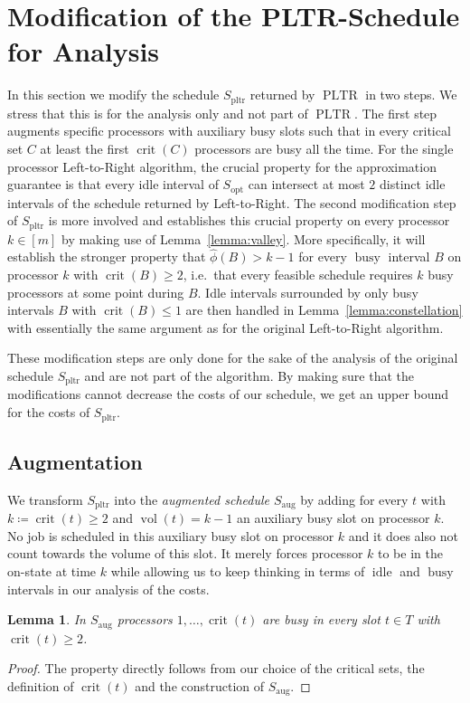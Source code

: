 \documentclass[a4paper]{article}
\DeclareMathOperator{\idle}{idle}
\DeclareMathOperator{\busy}{busy}
\DeclareMathOperator{\opt}{opt}
\DeclareMathOperator{\pltr}{pltr}
\DeclareMathOperator{\PLTR}{PLTR}
\DeclareMathOperator{\aug}{aug}
\DeclareMathOperator{\vol}{vol}
\DeclareMathOperator{\crit}{crit}
\newtheorem{lemma}[theorem]{Lemma}
\begin{document}
\section{Modification of the PLTR-Schedule for Analysis}\label{section:approximation}
In this section we modify the schedule $S_{\pltr}$ returned by $\PLTR$ in two steps.
We stress that this is for the analysis only and not part of $\PLTR$.
The first step augments specific processors with auxiliary busy slots such that in every critical set $C$ at least the first $\crit(C)$ processors are busy all the time.
For the single processor Left-to-Right algorithm, the crucial property for the approximation guarantee is that every idle interval of $S_{\opt}$ can intersect at most $2$ distinct idle intervals of the schedule returned by Left-to-Right.
The second modification step of $S_{\pltr}$ is more involved and establishes this crucial property on every processor $k \in [m]$ by making use of Lemma~\ref{lemma:valley}.
More specifically, it will establish the stronger property that $\hat \phi(B) > k - 1$ for every $\busy$ interval $B$ on processor $k$ with $\crit(B) \geq 2$, i.e.\ that every feasible schedule requires $k$ busy processors at some point during $B$.
Idle intervals surrounded by only busy intervals $B$ with $\crit(B) \leq 1$ are then handled in Lemma~\ref{lemma:constellation} with essentially the same argument as for the original Left-to-Right algorithm.

These modification steps are only done for the sake of the analysis of the original schedule $S_{\pltr}$ and are not part of the algorithm.
By making sure that the modifications cannot decrease the costs of our schedule, we get an upper bound for the costs of $S_{\pltr}$.

\subsection{Augmentation}
We transform $S_{\pltr}$ into the \emph{augmented schedule $S_{\aug}$} by adding for every $t$ with $k \coloneqq \crit(t) \geq 2$ and $\vol(t) = k-1$ an auxiliary busy slot on processor $k$.
No job is scheduled in this auxiliary busy slot on processor $k$ and it does also not count towards the volume of this slot.
It merely forces processor $k$ to be in the on-state at time $k$ while allowing us to keep thinking in terms of $\idle$ and $\busy$ intervals in our analysis of the costs.

\begin{lemma}\label{lemma:augmented}
  In $S_{\aug}$ processors $1, \ldots, \crit(t)$ are busy in every slot $t \in T$ with $\crit(t) \geq 2$.
\end{lemma}
\begin{proof}
  The property directly follows from our choice of the critical sets, the definition of $\crit(t)$ and the construction of $S_{\aug}$.
\end{proof}
\end{document}
